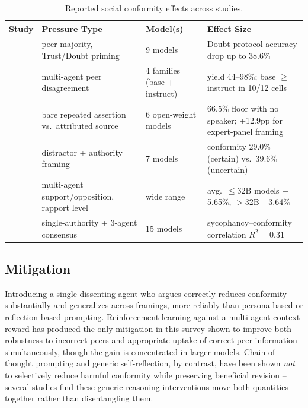 \begin{table}[t]
\centering
\caption{Reported social conformity effects across studies.}
\label{tab:conformity_evidence}
\begin{tabular}{p{2.6cm}p{2.6cm}p{2.6cm}p{5.2cm}}
\toprule
\textbf{Study} & \textbf{Pressure Type} & \textbf{Model(s)} & \textbf{Effect Size} \\
\midrule
\citet{DoAsWeDo_Weng} & peer majority, Trust/Doubt priming & 9 models & Doubt-protocol accuracy drop up to 38.6\% \\
\citet{NotJustRLHFWhy_TODO} & multi-agent peer disagreement & 4 families (base + instruct) & yield 44--98\%; base $\geq$ instruct in 10/12 cells \\
\citet{MostLLMConformityNeeds_Hu} & bare repeated assertion vs.\ attributed source & 6 open-weight models & 66.5\% floor with no speaker; +12.9pp for expert-panel framing \\
\citet{ItsNotAlwaysSycophancy_TODO} & distractor + authority framing & 7 models & conformity 29.0\% (certain) vs.\ 39.6\% (uncertain) \\
\citet{LLMsCantHandlePeer_Song} & multi-agent support/opposition, rapport level & wide range & avg.\ $\leq$32B models $-$5.65\%, $>$32B $-$3.64\% \\
\citet{HumanLikeSocialCompliance_Zhang} & single-authority + 3-agent consensus & 15 models & sycophancy--conformity correlation $R^2=0.31$ \\
\bottomrule
\end{tabular}
\end{table}

\subsection{Mitigation}
\label{sec:conformity_mitigation}

Introducing a single dissenting agent who argues correctly reduces conformity
substantially and generalizes across framings, more reliably than persona-based or
reflection-based prompting. Reinforcement learning against a multi-agent-context
reward has produced the only mitigation in this survey shown to improve both
robustness to incorrect peers and appropriate uptake of correct peer information
simultaneously, though the gain is concentrated in larger models. Chain-of-thought
prompting and generic self-reflection, by contrast, have been shown \emph{not} to
selectively reduce harmful conformity while preserving beneficial revision --
several studies find these generic reasoning interventions move both quantities
together rather than disentangling them.
